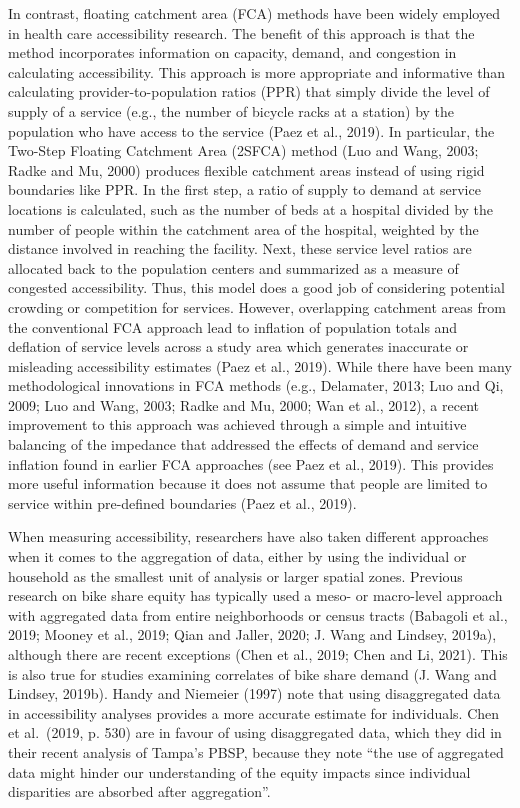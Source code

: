 \documentclass[]{elsarticle} %
\begin{document}
In contrast, floating catchment area (FCA) methods have been widely
employed in health care accessibility research. The benefit of this
approach is that the method incorporates information on capacity,
demand, and congestion in calculating accessibility. This approach is
more appropriate and informative than calculating provider-to-population
ratios (PPR) that simply divide the level of supply of a service (e.g.,
the number of bicycle racks at a station) by the population who have
access to the service (Paez et al., 2019). In particular, the Two-Step
Floating Catchment Area (2SFCA) method (Luo and Wang, 2003; Radke and
Mu, 2000) produces flexible catchment areas instead of using rigid
boundaries like PPR. In the first step, a ratio of supply to demand at
service locations is calculated, such as the number of beds at a
hospital divided by the number of people within the catchment area of
the hospital, weighted by the distance involved in reaching the
facility. Next, these service level ratios are allocated back to the
population centers and summarized as a measure of congested
accessibility. Thus, this model does a good job of considering potential
crowding or competition for services. However, overlapping catchment
areas from the conventional FCA approach lead to inflation of population
totals and deflation of service levels across a study area which
generates inaccurate or misleading accessibility estimates (Paez et al.,
2019). While there have been many methodological innovations in FCA
methods (e.g., Delamater, 2013; Luo and Qi, 2009; Luo and Wang, 2003;
Radke and Mu, 2000; Wan et al., 2012), a recent improvement to this
approach was achieved through a simple and intuitive balancing of the
impedance that addressed the effects of demand and service inflation
found in earlier FCA approaches (see Paez et al., 2019). This provides
more useful information because it does not assume that people are
limited to service within pre-defined boundaries (Paez et al., 2019).

When measuring accessibility, researchers have also taken different
approaches when it comes to the aggregation of data, either by using the
individual or household as the smallest unit of analysis or larger
spatial zones. Previous research on bike share equity has typically used
a meso- or macro-level approach with aggregated data from entire
neighborhoods or census tracts (Babagoli et al., 2019; Mooney et al.,
2019; Qian and Jaller, 2020; J. Wang and Lindsey, 2019a), although there
are recent exceptions (Chen et al., 2019; Chen and Li, 2021). This is
also true for studies examining correlates of bike share demand (J. Wang
and Lindsey, 2019b). Handy and Niemeier (1997) note that using
disaggregated data in accessibility analyses provides a more accurate
estimate for individuals. Chen et al.~(2019, p. 530) are in favour of
using disaggregated data, which they did in their recent analysis of
Tampa's PBSP, because they note ``the use of aggregated data might
hinder our understanding of the equity impacts since individual
disparities are absorbed after aggregation''.
\end{document}
